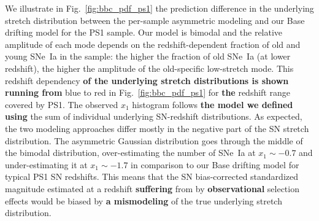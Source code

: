 \documentclass[referee]{aa}
\begin{document}
We illustrate in Fig.~\ref{fig:bbc_pdf_ps1} the prediction difference in the
underlying stretch distribution between the per-sample asymmetric modeling and
our Base drifting model for the PS1 sample. Our model is bimodal and the
relative amplitude of each mode depends on the redshift-dependent fraction of
old and young SNe~Ia in the sample: the higher the fraction of old SNe~Ia (at
lower redshift), the higher the amplitude of the old-specific low-stretch mode.
This redshift dependency \textbf{of the underlying stretch distributions is
shown running from} blue to red in Fig.~\ref{fig:bbc_pdf_ps1} for \textbf{the}
redshift range covered by PS1. The observed $x_1$ histogram follows \textbf{the
model we defined using} the sum of individual underlying SN-redshift
distributions. As expected, the two modeling approaches differ mostly in the
negative part of the SN stretch distribution. The asymmetric Gaussian
distribution goes through the middle of the bimodal distribution,
over-estimating the number of SNe~Ia at $x_1\sim-0.7$ and under-estimating it at
$x_1\sim-1.7$ in comparison to our Base drifting model for typical PS1 SN
redshifts. This means that the SN bias-corrected standardized magnitude
estimated at a redshift \textbf{suffering} from by \textbf{observational}
selection effects would be biased by \textbf{a mismodeling} of the true
underlying stretch distribution.
\end{document}
